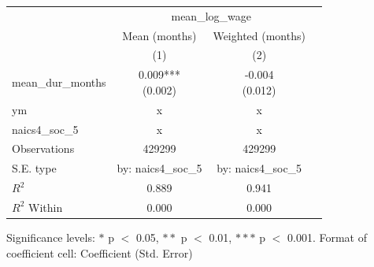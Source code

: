 \renewcommand\cellalign{t}
\begin{threeparttable}
\begin{tabular}{lccc}
\toprule
 & \multicolumn{2}{c}{mean_log_wage} \\
\cmidrule(lr){2-3} 
 & Mean (months) & Weighted (months) \\
 & (1) & (2) \\
\midrule
\addlinespace
mean_dur_months & \makecell{0.009*** \\ (0.002)} & \makecell{-0.004 \\ (0.012)} \\
\midrule
\addlinespace
ym & x & x \\
naics4_soc_5 & x & x \\
\midrule
\addlinespace
Observations & 429299 & 429299 \\
S.E. type & by: naics4_soc_5 & by: naics4_soc_5 \\
$R^2$ & 0.889 & 0.941 \\
$R^2$ Within & 0.000 & 0.000 \\
\bottomrule
\end{tabular}
\footnotesize Significance levels: $*$ p $<$ 0.05, $**$ p $<$ 0.01, $***$ p $<$ 0.001. Format of coefficient cell: Coefficient 
 (Std. Error)
\end{threeparttable}